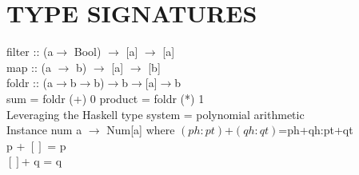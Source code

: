 \documentclass{article}
\begin{document}
\section {TYPE SIGNATURES}
filter :: (a$\rightarrow$ Bool) $\rightarrow$ [a] $\rightarrow$ [a] \\
map :: (a $\rightarrow$ b) $\rightarrow$ [a] $\rightarrow$ [b] \\
foldr :: (a$\rightarrow$b$\rightarrow$b)$\rightarrow$b$\rightarrow$[a]$\rightarrow$b \\
sum = foldr (+) 0
product = foldr (*) 1 \\
Leveraging the Haskell type system = polynomial arithmetic\\
Instance num a $\rightarrow$ Num[a] where $(ph:pt)$+$(qh:qt)$=ph+qh:pt+qt \\ 
p + $[]$ = p \\
$[]$+ q = q \\
\end{document}
